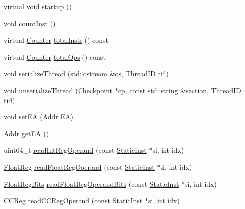 \begin{DoxyCompactItemize}
\item 
virtual void \hyperlink{classBaseSimpleCPU_aecc7d8debf54990ffeaaed5bac7d7d81}{startup} ()
\item 
void \hyperlink{classBaseSimpleCPU_ae14e8c918d9e0fa1f09581af157369e2}{countInst} ()
\item 
virtual \hyperlink{base_2types_8hh_ae1475755791765b8e6f6a8bb091e273e}{Counter} \hyperlink{classBaseSimpleCPU_abdcc0de01ff3d8d22a40e0b966acb463}{totalInsts} () const 
\item 
virtual \hyperlink{base_2types_8hh_ae1475755791765b8e6f6a8bb091e273e}{Counter} \hyperlink{classBaseSimpleCPU_adfb528b512cf037ade8dc8e22bf8a7bd}{totalOps} () const 
\item 
void \hyperlink{classBaseSimpleCPU_a688ca491f5419c29fb81f8235ba1dc13}{serializeThread} (std::ostream \&os, \hyperlink{base_2types_8hh_ab39b1a4f9dad884694c7a74ed69e6a6b}{ThreadID} tid)
\item 
void \hyperlink{classBaseSimpleCPU_a5122e6d6fdbdb3cb9ba72ae970f00a9e}{unserializeThread} (\hyperlink{classCheckpoint}{Checkpoint} $\ast$cp, const std::string \&section, \hyperlink{base_2types_8hh_ab39b1a4f9dad884694c7a74ed69e6a6b}{ThreadID} tid)
\item 
void \hyperlink{classBaseSimpleCPU_a2f9742f8d2bcf6a31ebfc121fd9d5fbc}{setEA} (\hyperlink{base_2types_8hh_af1bb03d6a4ee096394a6749f0a169232}{Addr} EA)
\item 
\hyperlink{base_2types_8hh_af1bb03d6a4ee096394a6749f0a169232}{Addr} \hyperlink{classBaseSimpleCPU_a840be0f7fe0a7a50b37b0552fe6ca506}{getEA} ()
\item 
uint64\_\-t \hyperlink{classBaseSimpleCPU_a9e7b0a4d5373c48902425c9456b19e7e}{readIntRegOperand} (const \hyperlink{classStaticInst}{StaticInst} $\ast$si, int idx)
\item 
\hyperlink{classBaseSimpleCPU_a75484259f1855aabc8d74c6eb1cfe186}{FloatReg} \hyperlink{classBaseSimpleCPU_a717c88c8c56d79c9ed554ba5992bd8c3}{readFloatRegOperand} (const \hyperlink{classStaticInst}{StaticInst} $\ast$si, int idx)
\item 
\hyperlink{classBaseSimpleCPU_aab5eeae86499f9bfe15ef79360eccc64}{FloatRegBits} \hyperlink{classBaseSimpleCPU_a39d93624e4481f4a210f2c46ea6b15b0}{readFloatRegOperandBits} (const \hyperlink{classStaticInst}{StaticInst} $\ast$si, int idx)
\item 
\hyperlink{classBaseSimpleCPU_a0c9de550a32808e6a25b54b6c791d5ab}{CCReg} \hyperlink{classBaseSimpleCPU_abbb38b103304a528dca50350209e8f82}{readCCRegOperand} (const \hyperlink{classStaticInst}{StaticInst} $\ast$si, int idx)

\end{DoxyCompactItemize}
